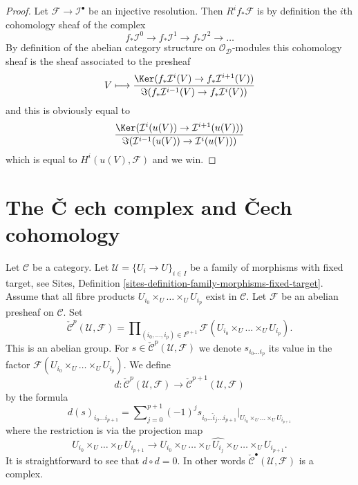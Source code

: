 \begin{proof}
Let $\mathcal{F} \to \mathcal{I}^\bullet$ be an injective resolution.
Then $R^if_*\mathcal{F}$ is by definition the $i$th cohomology sheaf
of the complex
$$
f_*\mathcal{I}^0 \to f_*\mathcal{I}^1 \to f_*\mathcal{I}^2 \to \ldots
$$
By definition of the abelian category structure on
$\mathcal{O}_\mathcal{D}$-modules
this cohomology sheaf is the sheaf associated to the presheaf
$$
V
\longmapsto
\frac{\Ker(f_*\mathcal{I}^i(V) \to f_*\mathcal{I}^{i + 1}(V))}
{\Im(f_*\mathcal{I}^{i - 1}(V) \to f_*\mathcal{I}^i(V))}
$$
and this is obviously equal to
$$
\frac{\Ker(\mathcal{I}^i(u(V)) \to \mathcal{I}^{i + 1}(u(V)))}
{\Im(\mathcal{I}^{i - 1}(u(V)) \to \mathcal{I}^i(u(V)))}
$$
which is equal to $H^i(u(V), \mathcal{F})$
and we win.
\end{proof}

\section{The {\v C}
ech complex and {\v C}ech cohomology}
\label{sites-cohomology-section-cech}

Let $\mathcal{C}$ be a category. Let $\mathcal{U} = \{U_i \to U\}_{i \in I}$
be a family of morphisms with fixed target, see
Sites, Definition \ref{sites-definition-family-morphisms-fixed-target}.
Assume that all fibre products $U_{i_0} \times_U \ldots \times_U U_{i_p}$
exist in $\mathcal{C}$. Let $\mathcal{F}$ be an abelian presheaf on
$\mathcal{C}$. Set
$$
\check{\mathcal{C}}^p(\mathcal{U}, \mathcal{F})
=
\prod\nolimits_{(i_0, \ldots, i_p) \in I^{p + 1}}
\mathcal{F}(U_{i_0} \times_U \ldots \times_U U_{i_p}).
$$
This is an abelian group. For
$s \in \check{\mathcal{C}}^p(\mathcal{U}, \mathcal{F})$ we denote
$s_{i_0\ldots i_p}$ its value in the factor
$\mathcal{F}(U_{i_0} \times_U \ldots \times_U U_{i_p})$.
We define
$$
d : \check{\mathcal{C}}^p(\mathcal{U}, \mathcal{F})
\longrightarrow
\check{\mathcal{C}}^{p + 1}(\mathcal{U}, \mathcal{F})
$$
by the formula
\begin{equation}
\label{equation-d-cech}
d(s)_{i_0\ldots i_{p + 1}} =
\sum\nolimits_{j = 0}^{p + 1}
(-1)^j s_{i_0\ldots \hat i_j \ldots i_{p + 1}}
|_{U_{i_0} \times_U \ldots \times_U U_{i_{p + 1}}}
\end{equation}
where the restriction is via the projection map
$$
U_{i_0} \times_U \ldots \times_U U_{i_{p + 1}} \longrightarrow
U_{i_0} \times_U \ldots \times_U \widehat{U_{i_j}} \times_U
\ldots \times_U U_{i_{p + 1}}.
$$
It is straightforward to see that $d \circ d = 0$. In other words
$\check{\mathcal{C}}^\bullet(\mathcal{U}, \mathcal{F})$ is a complex.


